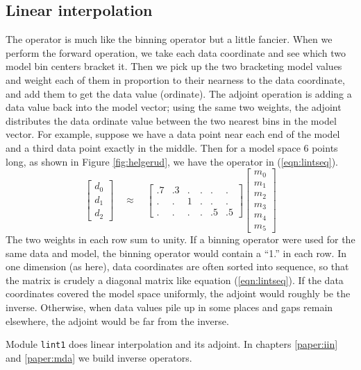 \subsection{Linear interpolation}
\par
{}
The 
operator is much like the binning operator but a little fancier.
When we perform the forward operation, we take each data coordinate
and see which two model bin centers bracket it.
Then we pick up the two bracketing model values
and weight each of them
in proportion to their nearness to the data coordinate,
and add them to get the data value (ordinate).
The adjoint operation is adding a data value
back into the model vector;
using the same two weights,
the adjoint distributes the data ordinate value
between the two nearest bins in the model vector.
For example, suppose we have a data point near each end of the model
and a third data point exactly in the middle.
Then for a model space 6 points long,
as shown in Figure \ref{fig:helgerud},
we have the operator in (\ref{eqn:lintseq}).
\begin{equation}
\left[ 
\begin{array}{c}
  d_0 \\ 
  d_1 \\ 
  d_2 
  \end{array} \right] 
\quad \approx \quad
\left[ 
\begin{array}{rrrrrr}
   .7 & .3 &  .  & .  & .  & .  \\
   .  & .  &  1  & .  & .  & .  \\
   .  & .  &  .  & .  & .5 & .5 
  \end{array} \right] 
\left[ 
        \begin{array}{c}
          m_0 \\ 
          m_1 \\ 
          m_2 \\ 
          m_3 \\ 
          m_4 \\ 
          m_5
        \end{array}
\right] 
\label{eqn:lintseq}
\end{equation}
The two weights in each row sum to unity.
If a binning operator were used for the same data and model,
the binning operator would contain a ``1.'' in each row.
In one dimension (as here),
data coordinates are often sorted into sequence,
so that the matrix is crudely a diagonal matrix like equation (\ref{eqn:lintseq}).
If the data coordinates covered the model space uniformly,
the adjoint would roughly be the inverse.
Otherwise,
when data values pile up in some places and gaps remain elsewhere,
the adjoint would be far from the inverse.
\par
Module \texttt{lint1} does linear interpolation and its adjoint.
In chapters \ref{paper:iin} and \ref{paper:mda}
we build inverse operators.

